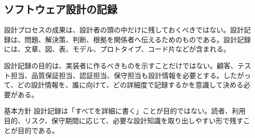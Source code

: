 \subsection{ソフトウェア設計の記録}

設計プロセスの成果は、設計者の頭の中だけに残しておくべきではない。設計記録は、問題、解決策、判断、根拠を関係者へ伝えるためのものである。設計記録には、文章、図、表、モデル、プロトタイプ、コード片などが含まれる。

設計記録の目的は、実装者に作るべきものを示すことだけではない。顧客、テスト担当、品質保証担当、認証担当、保守担当も設計情報を必要とする。したがって、どの設計情報を、誰に向けて、どの詳細度で記録するかを意識して決める必要がある。

\begin{pointbox}{基本方針}
設計記録は「すべてを詳細に書く」ことが目的ではない。読者、利用目的、リスク、保守期間に応じて、必要な設計知識を取り出しやすい形で残すことが目的である。
\end{pointbox}
